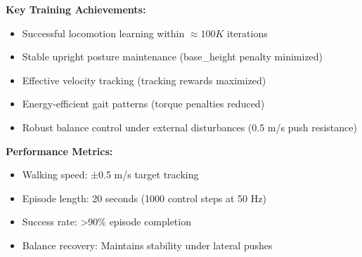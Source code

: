\documentclass[a1paper,portrait,fontscale=0.5]{baposter}
\newcommand{\compresslist}{%
\vspace{-0.5em}%
\setlength{\itemsep}{0pt}%
\setlength{\parskip}{0pt}%
\setlength{\parsep}{0pt}%
\setlength{\topsep}{0pt}%
}
\begin{document}
\begin{poster}
{\vspace{-1.0em}
\begin{minipage}[t]{0.47\linewidth}
\footnotesize
\textbf{Key Training Achievements:}
\begin{itemize}\compresslist
    \item Successful locomotion learning within $\approx 100K$ iterations
    \item Stable upright posture maintenance (base\_height penalty minimized)
    \item Effective velocity tracking (tracking rewards maximized)
    \item Energy-efficient gait patterns (torque penalties reduced)
    \item Robust balance control under external disturbances (0.5 m/s push resistance)
\end{itemize}
\end{minipage}
\hfill
\begin{minipage}[t]{0.47\linewidth}
\footnotesize
\textbf{Performance Metrics:}
\begin{itemize}\compresslist
    \item Walking speed: ±0.5 m/s target tracking
    \item Episode length: 20 seconds (1000 control steps at 50 Hz)
    \item Success rate: >90\% episode completion
    \item Balance recovery: Maintains stability under lateral pushes
\end{itemize}
\end{minipage}
}

\end{poster}
\end{document}
